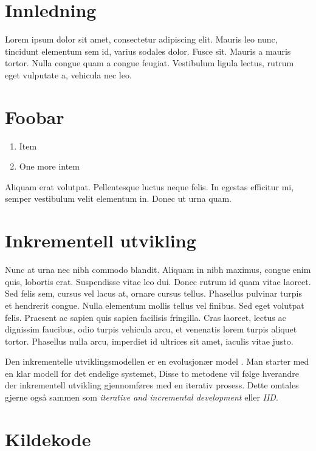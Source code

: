 
\section{Innledning}
Lorem ipsum dolor sit amet, consectetur adipiscing elit. Mauris leo nunc, tincidunt elementum sem id, varius sodales dolor. Fusce sit.
Mauris a mauris tortor. Nulla congue quam a congue feugiat. Vestibulum ligula lectus, rutrum eget vulputate a, vehicula nec leo.

\section{Foobar}
\begin{enumerate}
\item Item
\item One more intem
\end{enumerate}

Aliquam erat volutpat. Pellentesque luctus neque felis. In egestas efficitur mi, semper vestibulum velit elementum in. Donec ut urna quam.


\section{Inkrementell utvikling}
Nunc at urna nec nibh commodo blandit. Aliquam in nibh maximus, congue enim quis, lobortis erat. Suspendisse vitae leo dui. Donec rutrum id quam vitae laoreet. Sed felis sem, cursus vel lacus at, ornare cursus tellus. Phasellus pulvinar turpis et hendrerit congue. Nulla elementum mollis tellus vel finibus. Sed eget volutpat felis. Praesent ac sapien quis sapien facilisis fringilla. Cras laoreet, lectus ac dignissim faucibus, odio turpis vehicula arcu, et venenatis lorem turpis aliquet tortor. Phasellus nulla arcu, imperdiet id ultrices sit amet, iaculis vitae justo.


Den inkrementelle utviklingsmodellen er en evolusjonær model \cite{wiki:incremental_build_model}. Man starter med en klar modell for det endelige systemet, 
Disse to metodene vil følge hverandre der inkrementell utvikling gjennomføres med en iterativ prosess.
Dette omtales gjerne også sammen som \textit{iterative and incremental development} eller \textit{IID}.

\section{Kildekode}




